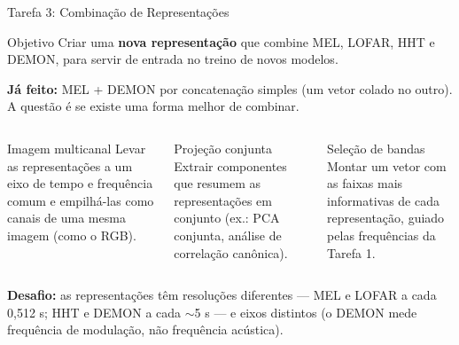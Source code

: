 \documentclass[aspectratio=169]{beamer}
\begin{document}
\begin{frame}{Tarefa 3: Combinação de Representações}
    \footnotesize
    \begin{block}{\small Objetivo}
        \scriptsize
        Criar uma \textbf{nova representação} que combine MEL, LOFAR, HHT e DEMON, para servir de entrada no treino de novos modelos.
    \end{block}

    \vspace{0.05cm}
    {\scriptsize\textbf{Já feito:} MEL + DEMON por concatenação simples (um vetor colado no outro). A questão é se existe uma forma melhor de combinar.\par}

    \vspace{0.05cm}
    \begin{columns}[t]
        \begin{block}{\small Imagem multicanal}
            \scriptsize
            Levar as representações a um eixo de tempo e frequência comum e empilhá-las como canais de uma mesma imagem (como o RGB).
        \end{block}

        \begin{block}{\small Projeção conjunta}
            \scriptsize
            Extrair componentes que resumem as representações em conjunto (ex.: PCA conjunta, análise de correlação canônica).
        \end{block}

        \begin{block}{\small Seleção de bandas}
            \scriptsize
            Montar um vetor com as faixas mais informativas de cada representação, guiado pelas frequências da Tarefa 1.
        \end{block}
    \end{columns}

    \vspace{0.1cm}
    {\scriptsize\textbf{Desafio:} as representações têm resoluções diferentes --- MEL e LOFAR a cada 0,512 s; HHT e DEMON a cada $\sim$5 s --- e eixos distintos (o DEMON mede frequência de modulação, não frequência acústica).\par}
\end{frame}
\end{document}
